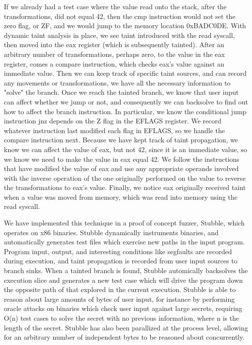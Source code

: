 \documentclass[11pt,expanded,copyright]{fsuthesis}
\begin{document}
If we already had a test case where the value read onto the stack, after the transformations, did not equal 42, then the cmp instruction would not set the zero flag, or ZF, and we would jump to the memory location 0xBADC0DE. With dynamic taint analysis in place, we see taint introduced with the read syscall, then moved into the eax register (which is subsequently tainted). After an arbitrary number of transformations, perhaps zero, to the value in the eax register, comes a compare instruction, which checks eax's value against an immediate value. Then we can keep track of specific taint sources, and can record any movements or transformations, we have all the necessary information to "solve" the branch. Once we reach the tainted branch, we know that user input can affect whether we jump or not, and consequently we can backsolve to find out how to affect the branch instruction. In particular, we know the conditional jump instruction jnz depends on the Z flag in the EFLAGS register. We record whatever instruction last modified each flag in EFLAGS, so we handle the compare instruction next. Because we have kept track of taint propagation, we know we can affect the value of eax, but not 42, since it is an immediate value, so we know we need to make the value in eax equal 42. We follow the instructions that have modified the value of eax and use any appropriate operands involved with the inverse operation of the one originally performed on the value to reverse the transformations to eax's value. Finally, we notice eax originally received taint when a value was moved from memory, which was read into memory using the read syscall.

We have implemented this technique in a proof of concept fuzzer, Stubble, which operates on x86 binaries. Stubble dynamically instruments binaries, and automatically generates test files which exercise new paths in the input program. Program input, output, and interesting conditions like segfaults are recorded during execution, and taint propagation is recorded from user input sources to branch sinks. When a tainted branch is found, Stubble automically backsolves the execution slice and generates a new test case which will drive the program down the opposite path of that explored in the current execution. Stubble is able to reason about large amounts of bytes of user input, for instance by performing oracle attacks on binaries which check user input against large secrets, requiring O(n) test cases to solve the secret with no previous information, where n is the length of the secret. Stubble has also been parallized at the process level, allowing for an arbitrary number of independent bytes to be reasoned about concurrently. 
\end{document}
